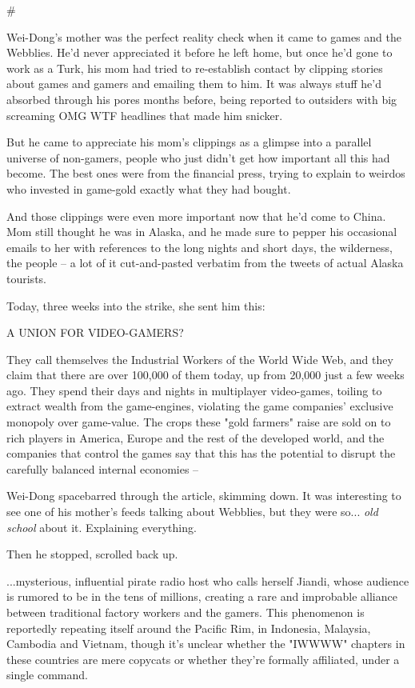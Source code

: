 \#

Wei-Dong's mother was the perfect reality check when it came to
games and the Webblies. He'd never appreciated it before he left
home, but once he'd gone to work as a Turk, his mom had tried to
re-establish contact by clipping stories about games and gamers and
emailing them to him. It was always stuff he'd absorbed through his
pores months before, being reported to outsiders with big screaming
OMG WTF headlines that made him snicker.

But he came to appreciate his mom's clippings as a glimpse into a
parallel universe of non-gamers, people who just didn't get how
important all this had become. The best ones were from the
financial press, trying to explain to weirdos who invested in
game-gold exactly what they had bought.

And those clippings were even more important now that he'd come to
China. Mom still thought he was in Alaska, and he made sure to
pepper his occasional emails to her with references to the long
nights and short days, the wilderness, the people -- a lot of it
cut-and-pasted verbatim from the tweets of actual Alaska tourists.

Today, three weeks into the strike, she sent him this:

A UNION FOR VIDEO-GAMERS?

They call themselves the Industrial Workers of the World Wide Web,
and they claim that there are over 100,000 of them today, up from
20,000 just a few weeks ago. They spend their days and nights in
multiplayer video-games, toiling to extract wealth from the
game-engines, violating the game companies' exclusive monopoly over
game-value. The crops these "gold farmers" raise are sold on to
rich players in America, Europe and the rest of the developed
world, and the companies that control the games say that this has
the potential to disrupt the carefully balanced internal economies
--

Wei-Dong spacebarred through the article, skimming down. It was
interesting to see one of his mother's feeds talking about
Webblies, but they were so... \emph{old school} about it.
Explaining everything.

Then he stopped, scrolled back up.

...mysterious, influential pirate radio host who calls herself
Jiandi, whose audience is rumored to be in the tens of millions,
creating a rare and improbable alliance between traditional factory
workers and the gamers. This phenomenon is reportedly repeating
itself around the Pacific Rim, in Indonesia, Malaysia, Cambodia and
Vietnam, though it's unclear whether the "IWWWW" chapters in these
countries are mere copycats or whether they're formally affiliated,
under a single command.

